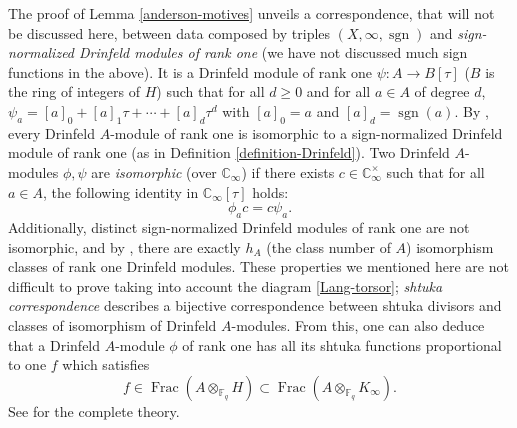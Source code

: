 \documentclass[11pt]{amsart}
\numberwithin{equation}{section}
\newcommand{\FF}{\mathbb{F}}
\newcommand{\CC}{\mathbb{C}}
\newcommand{\sgn}{\operatorname{sgn}}
\begin{document}
The proof of Lemma \ref{anderson-motives} unveils a correspondence, that will not be discussed here, between data composed by triples $(X,\infty,\sgn)$
and {\em sign-normalized Drinfeld modules of rank one} (we have not discussed much sign functions in the above). It is a Drinfeld module of rank one
$\psi:A\rightarrow B[\tau]$ ($B$ is the ring of integers of $H$) such that for all $d\geq 0$ and for all $a\in A$ of degree $d$, $\psi_a=[a]_0+[a]_1\tau+\cdots+[a]_d\tau^d$ with $[a]_0=a$ and $[a]_d=\sgn(a)$. By \cite[Theorem 7.2.15]{GOS}, every
Drinfeld $A$-module of rank one is isomorphic to a sign-normalized Drinfeld module of rank one (as in Definition \ref{definition-Drinfeld}). Two Drinfeld $A$-modules $\phi,\psi$ are {\em isomorphic} (over $\CC_\infty$) if there exists $c\in\CC_\infty^\times$ such that for all $a\in A$, the following identity in $\CC_\infty[\tau]$ holds: $$\phi_ac=c\psi_a.$$ Additionally, distinct sign-normalized Drinfeld modules of rank one are not isomorphic, and by \cite[Proposition 7.2.17]{GOS}, there are exactly $h_A$ (the class number of $A$) isomorphism classes of rank one Drinfeld modules. These properties we mentioned here are not difficult to prove taking into account the diagram
\eqref{Lang-torsor}; {\em shtuka correspondence} \cite[\S 6.2]{GOS} describes a bijective correspondence between shtuka divisors and classes of isomorphism of Drinfeld $A$-modules. From this, one can also deduce that a Drinfeld $A$-module $\phi$ of rank one has all its shtuka functions
proportional to one $f$ which satisfies 
$$f\in\operatorname{Frac}(A\otimes_{\FF_q}H)\subset\operatorname{Frac}(A\otimes_{\FF_q}K_\infty).$$ 
See \cite[Chapter 7]{GOS} for the complete theory.
\end{document}
